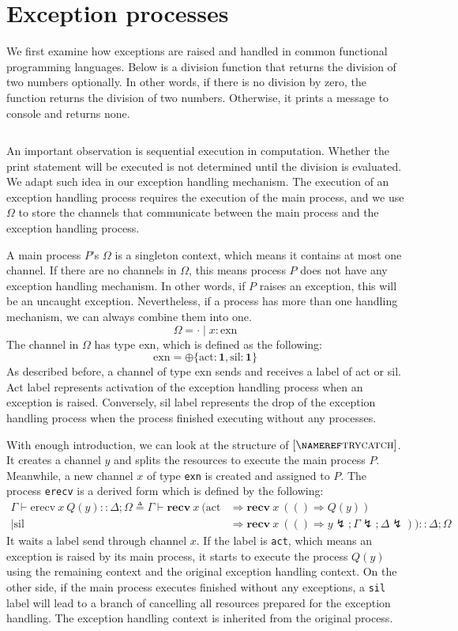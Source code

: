 \documentclass[12pt, openany]{memoir}
\newcommand*{\recv}[2]{\textbf{recv}\ #1\ #2}
\newcommand*{\cancel}[1]{#1 \lightning}
\begin{document}
\section{Exception processes}
We first examine how exceptions are raised and handled in common functional programming languages. 
Below is a division function that returns the division of two numbers optionally. In other words,
if there is no division by zero, the function returns the division of two numbers.
Otherwise, it prints a message to console and returns none. 
\inputminted{ocaml}{code/div.ml} 
An important observation is sequential execution in computation.
Whether the print statement will be executed is not determined until the division is evaluated.
We adapt such idea in our exception handling mechanism. 
The execution of an exception handling process requires the execution of the main process,
and we use $\Omega$ to store the channels that communicate between the main process and the exception handling process.
 
A main process $P$'s $\Omega$ is a singleton context, which means it contains at most one channel.
If there are no channels in $\Omega$, this means process $P$ does not have any exception handling mechanism.
In other words, if $P$ raises an exception, this will be an uncaught exception. 
Nevertheless, if a process has more than one handling mechanism, we can always combine them into one.
\[
  \Omega = \cdot \mid x : \text{exn}
\]
The channel in $\Omega$ has type $\text{exn}$, which is defined as the following:
\[
  \text{exn} = \oplus\{\text{act} : \textbf{1}, \text{sil} : \textbf{1}\}
\]
As described before, a channel of type $\text{exn}$ sends and receives a label of act or sil. 
Act label represents activation of the exception handling process when an exception is raised.
Conversely, sil label represents the drop of the exception handling process when the process finished executing without any processes.

With enough introduction, we can look at the structure of $\ruleref{trycatch}$. 
It creates a channel $y$ and splits the resources to execute the main process $P$.
Meanwhile, a new channel $x$ of type \texttt{exn} is created and assigned to $P$.
The process \texttt{erecv} is a derived form which is defined by the following:
\begin{align*}
  \Gamma \vdash \text{erecv}\ x\ Q(y) :: \Delta ; \Omega \triangleq \Gamma \vdash \recv{x}{(\text{act} &\Rightarrow \recv{x}{(() \Rightarrow Q(y))} \\ 
  \mid \text{sil} &\Rightarrow \recv{x}{(() \Rightarrow \cancel{y}; \cancel{\Gamma}; \cancel{\Delta})})} :: \Delta; \Omega
\end{align*}
It waits a label send through channel $x$. 
If the label is \texttt{act}, which means an exception is raised by its main process, 
it starts to execute the process $Q(y)$ using the remaining context and the original exception handling context.
On the other side, if the main process executes finished without any exceptions, 
a \texttt{sil} label will lead to a branch of cancelling all resources prepared for the exception handling.
The exception handling context is inherited from the original process.
\end{document}

